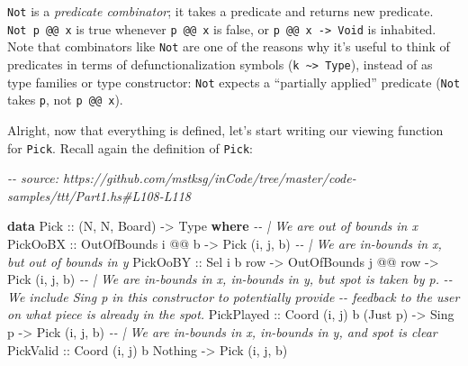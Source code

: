 \documentclass[]{article}
\newenvironment{Shaded}{}{}
\newcommand{\CommentTok}[1]{\textcolor[rgb]{0.38,0.63,0.69}{\textit{#1}}}
\newcommand{\DataTypeTok}[1]{\textcolor[rgb]{0.56,0.13,0.00}{#1}}
\newcommand{\KeywordTok}[1]{\textcolor[rgb]{0.00,0.44,0.13}{\textbf{#1}}}
\newcommand{\NormalTok}[1]{#1}
\newcommand{\OperatorTok}[1]{\textcolor[rgb]{0.40,0.40,0.40}{#1}}
\newcommand{\OtherTok}[1]{\textcolor[rgb]{0.00,0.44,0.13}{#1}}
\begin{document}
\texttt{Not} is a \emph{predicate combinator}; it takes a predicate and returns
new predicate. \texttt{Not\ p\ @@\ x} is true whenever \texttt{p\ @@\ x} is
false, or \texttt{p\ @@\ x\ -\textgreater{}\ Void} is inhabited. Note that
combinators like \texttt{Not} are one of the reasons why it's useful to think of
predicates in terms of defunctionalization symbols
(\texttt{k\ \textasciitilde{}\textgreater{}\ Type}), instead of as type families
or type constructor: \texttt{Not} expects a ``partially applied'' predicate
(\texttt{Not} takes \texttt{p}, not \texttt{p\ @@\ x}).

Alright, now that everything is defined, let's start writing our viewing
function for \texttt{Pick}. Recall again the definition of \texttt{Pick}:

\begin{Shaded}
\begin{Highlighting}[]
\CommentTok{{-}{-} source: https://github.com/mstksg/inCode/tree/master/code{-}samples/ttt/Part1.hs\#L108{-}L118}

\KeywordTok{data} \DataTypeTok{Pick}\OtherTok{ ::}\NormalTok{ (}\DataTypeTok{N}\NormalTok{, }\DataTypeTok{N}\NormalTok{, }\DataTypeTok{Board}\NormalTok{) }\OtherTok{{-}\textgreater{}} \DataTypeTok{Type} \KeywordTok{where}
    \CommentTok{{-}{-} | We are out of bounds in x}
    \DataTypeTok{PickOoBX}\OtherTok{   ::} \DataTypeTok{OutOfBounds}\NormalTok{ i }\OperatorTok{@@}\NormalTok{ b                         }\OtherTok{{-}\textgreater{}} \DataTypeTok{Pick}\NormalTok{ \textquotesingle{}(i, j, b)}
    \CommentTok{{-}{-} | We are in{-}bounds in x, but out of bounds in y}
    \DataTypeTok{PickOoBY}\OtherTok{   ::} \DataTypeTok{Sel}\NormalTok{ i b row        }\OtherTok{{-}\textgreater{}} \DataTypeTok{OutOfBounds}\NormalTok{ j }\OperatorTok{@@}\NormalTok{ row }\OtherTok{{-}\textgreater{}} \DataTypeTok{Pick}\NormalTok{ \textquotesingle{}(i, j, b)}
    \CommentTok{{-}{-} | We are in{-}bounds in x, in{-}bounds in y, but spot is taken by \textasciigrave{}p\textasciigrave{}.}
    \CommentTok{{-}{-} We include \textasciigrave{}Sing p\textasciigrave{} in this constructor to potentially provide}
    \CommentTok{{-}{-} feedback to the user on what piece is already in the spot.}
    \DataTypeTok{PickPlayed}\OtherTok{ ::} \DataTypeTok{Coord}\NormalTok{ \textquotesingle{}(i, j) b (}\DataTypeTok{\textquotesingle{}Just}\NormalTok{ p) }\OtherTok{{-}\textgreater{}} \DataTypeTok{Sing}\NormalTok{ p        }\OtherTok{{-}\textgreater{}} \DataTypeTok{Pick}\NormalTok{ \textquotesingle{}(i, j, b)}
    \CommentTok{{-}{-} | We are in{-}bounds in x, in{-}bounds in y, and spot is clear}
    \DataTypeTok{PickValid}\OtherTok{  ::} \DataTypeTok{Coord}\NormalTok{ \textquotesingle{}(i, j) b }\DataTypeTok{\textquotesingle{}Nothing}                   \OtherTok{{-}\textgreater{}} \DataTypeTok{Pick}\NormalTok{ \textquotesingle{}(i, j, b)}
\end{Highlighting}
\end{Shaded}
\end{document}
